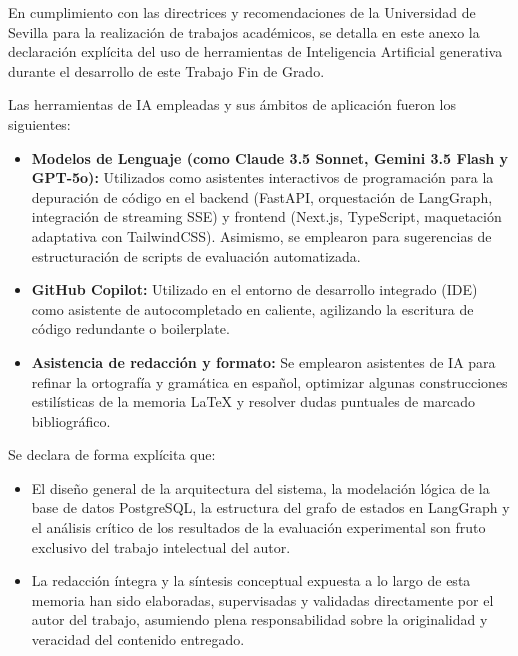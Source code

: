 \documentclass[12pt,a4paper,oneside]{report}
\begin{document}
En cumplimiento con las directrices y recomendaciones de la Universidad de Sevilla para la realización de trabajos académicos, se detalla en este anexo la declaración explícita del uso de herramientas de Inteligencia Artificial generativa durante el desarrollo de este Trabajo Fin de Grado.

Las herramientas de IA empleadas y sus ámbitos de aplicación fueron los siguientes:
\begin{itemize}
    \item \textbf{Modelos de Lenguaje (como Claude 3.5 Sonnet, Gemini 3.5 Flash y GPT-5o):} Utilizados como asistentes interactivos de programación para la depuración de código en el backend (FastAPI, orquestación de LangGraph, integración de streaming SSE) y frontend (Next.js, TypeScript, maquetación adaptativa con TailwindCSS). Asimismo, se emplearon para sugerencias de estructuración de scripts de evaluación automatizada.
    \item \textbf{GitHub Copilot:} Utilizado en el entorno de desarrollo integrado (IDE) como asistente de autocompletado en caliente, agilizando la escritura de código redundante o boilerplate.
    \item \textbf{Asistencia de redacción y formato:} Se emplearon asistentes de IA para refinar la ortografía y gramática en español, optimizar algunas construcciones estilísticas de la memoria LaTeX y resolver dudas puntuales de marcado bibliográfico.
\end{itemize}

Se declara de forma explícita que:
\begin{itemize}
    \item El diseño general de la arquitectura del sistema, la modelación lógica de la base de datos PostgreSQL, la estructura del grafo de estados en LangGraph y el análisis crítico de los resultados de la evaluación experimental son fruto exclusivo del trabajo intelectual del autor.
    \item La redacción íntegra y la síntesis conceptual expuesta a lo largo de esta memoria han sido elaboradas, supervisadas y validadas directamente por el autor del trabajo, asumiendo plena responsabilidad sobre la originalidad y veracidad del contenido entregado.
\end{itemize}
\end{document}
